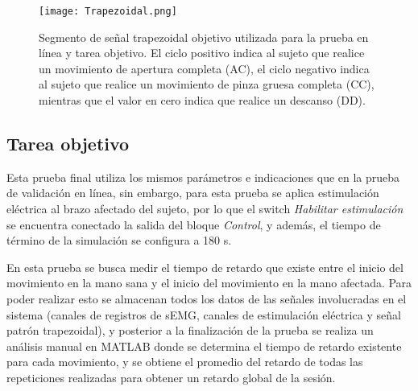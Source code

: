 \begin{figure}
	\centering
	\texttt{[image: Trapezoidal.png]}
	\caption[Señal trapezoidal objetivo]{Segmento de señal trapezoidal objetivo utilizada para la prueba en línea y tarea objetivo. El ciclo positivo indica al sujeto que realice un movimiento de apertura completa (AC), el ciclo negativo indica al sujeto que realice un movimiento de pinza gruesa completa (CC), mientras que el valor en cero indica que realice un descanso (DD).}
	\label{Figura: Trapezoidal}
\end{figure}

\newpage
\subsection{Tarea objetivo}
Esta prueba final utiliza los mismos parámetros e indicaciones que en la prueba de validación en línea, sin embargo, para esta prueba se aplica estimulación eléctrica al brazo afectado del sujeto, por lo que el switch \emph{Habilitar estimulación} se encuentra conectado la salida del bloque \emph{Control}, y además, el tiempo de término de la simulación se configura a 180 s.

En esta prueba se busca medir el tiempo de retardo que existe entre el inicio del movimiento en la mano sana y el inicio del movimiento en la mano afectada. Para poder realizar esto se almacenan todos los datos de las señales involucradas en el sistema (canales de registros de sEMG, canales de estimulación eléctrica y señal patrón trapezoidal), y posterior a la finalización de la prueba se realiza un análisis manual en MATLAB donde se determina el tiempo de retardo existente para cada movimiento, y se obtiene el promedio del retardo de todas las repeticiones realizadas para obtener un retardo global de la sesión.


